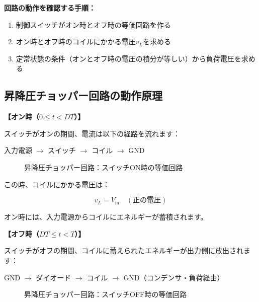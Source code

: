\textbf{回路の動作を確認する手順：}

\begin{enumerate}
\item 制御スイッチがオン時とオフ時の等価回路を作る
\item オン時とオフ時のコイルにかかる電圧$v_L$を求める
\item 定常状態の条件（オンとオフ時の電圧の積分が等しい）から負荷電圧を求める
\end{enumerate}

\subsection{昇降圧チョッパー回路の動作原理}

\textbf{【オン時（$0 \le t < DT$）】}

スイッチがオンの期間、電流は以下の経路を流れます：

\begin{center}
入力電源 $\rightarrow$ スイッチ $\rightarrow$ コイル $\rightarrow$ GND
\end{center}

\begin{figure}[H]
\centering
{}
\caption{昇降圧チョッパー回路：スイッチON時の等価回路}
\label{fig:ch05_buckboost_on}
\end{figure}

この時、コイルにかかる電圧は：

\begin{equation}
v_L = V_{\text{in}} \quad (\text{正の電圧})
\end{equation}

オン時には、入力電源からコイルにエネルギーが蓄積されます。

\textbf{【オフ時（$DT \le t < T$）】}

スイッチがオフの期間、コイルに蓄えられたエネルギーが出力側に放出されます：

\begin{center}
GND $\rightarrow$ ダイオード $\rightarrow$ コイル $\rightarrow$ GND（コンデンサ・負荷経由）
\end{center}

\begin{figure}[H]
\centering
{}
\caption{昇降圧チョッパー回路：スイッチOFF時の等価回路}
\label{fig:ch05_buckboost_off}
\end{figure}

